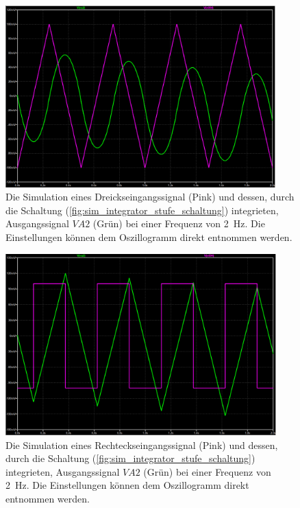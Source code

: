 \documentclass[12pt,english,ngerman]{scrartcl}
\begin{document}
\begin{figure}[H]
  \centering
    \includegraphics[width=\linewidth, height=7cm]{./figures/integrator/sim/mit_stufe/dreieck100mv_500ms.png}
    \caption{Die Simulation eines Dreickseingangssignal (Pink) und dessen,
    durch die Schaltung (\autoref{fig:sim_integrator_stufe_schaltung})
    integrieten, Ausgangssignal $VA2$ (Grün) bei einer Frequenz von
    \SI{2}{\hertz}. Die Einstellungen können dem Oszillogramm direkt entnommen
    werden.}
  \label{fig:sim_int_stufe_tri}
\end{figure}

\begin{figure}[H]
  \centering
    \includegraphics[width=\linewidth, height=7cm]{./figures/integrator/sim/mit_stufe/rechteck100mv_500ms.png}
  \caption{Die Simulation eines Rechteckseingangssignal (Pink) und dessen,
  durch die Schaltung (\autoref{fig:sim_integrator_stufe_schaltung})
  integrieten, Ausgangssignal $VA2$ (Grün) bei einer Frequenz von \SI{2}{\hertz}.
  Die Einstellungen können dem Oszillogramm direkt entnommen werden.}
  \label{fig:sim_int_stufe_rect}
\end{figure}


\end{document}
